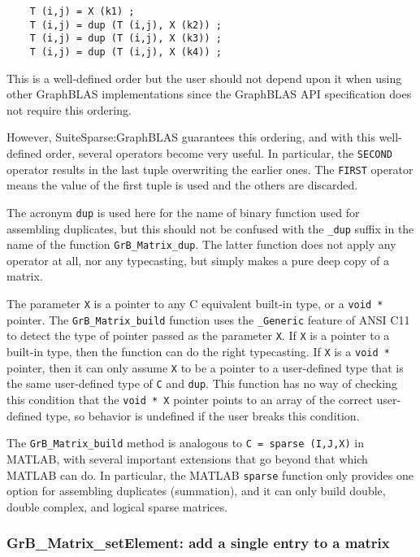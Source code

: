\documentclass[12pt]{article}
\begin{document}
    {\footnotesize
    \begin{verbatim}
    T (i,j) = X (k1) ;
    T (i,j) = dup (T (i,j), X (k2)) ;
    T (i,j) = dup (T (i,j), X (k3)) ;
    T (i,j) = dup (T (i,j), X (k4)) ; \end{verbatim}}

This is a well-defined order but the user should not depend upon it when using
other GraphBLAS implementations since the GraphBLAS API specification does not
require this ordering.

However, SuiteSparse:GraphBLAS guarantees this ordering, and with this
well-defined order, several operators become very useful.  In particular, the
\verb'SECOND' operator results in the last tuple overwriting the earlier ones.
The \verb'FIRST' operator means the value of the first tuple is used and the
others are discarded.

The acronym \verb'dup' is used here for the name of binary function used for
assembling duplicates, but this should not be confused with the \verb'_dup'
suffix in the name of the function \verb'GrB_Matrix_dup'.  The latter function
does not apply any operator at all, nor any typecasting, but simply makes a
pure deep copy of a matrix.

The parameter \verb'X' is a pointer to any C equivalent built-in type, or a
\verb'void *' pointer.  The \verb'GrB_Matrix_build' function uses the
\verb'_Generic' feature of ANSI C11 to detect the type of pointer passed as the
parameter \verb'X'.  If \verb'X' is a pointer to a built-in type, then the
function can do the right typecasting.  If \verb'X' is a \verb'void *' pointer,
then it can only assume \verb'X' to be a pointer to a user-defined type that is
the same user-defined type of \verb'C' and \verb'dup'.  This function has no
way of checking this condition that the \verb'void * X' pointer points to an
array of the correct user-defined type, so behavior is undefined if the user
breaks this condition.

The \verb'GrB_Matrix_build' method is analogous to \verb'C = sparse (I,J,X)' in
MATLAB, with several important extensions that go beyond that which MATLAB can
do.  In particular, the MATLAB \verb'sparse' function only provides one option
for assembling duplicates (summation), and it can only build double, double
complex, and logical sparse matrices.

\newpage
\subsubsection{{\sf GrB\_Matrix\_setElement:}   add a single entry to a matrix}
\label{matrix_setElement}
\end{document}

